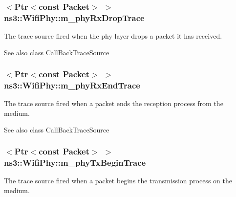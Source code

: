 \subsubsection[{\texorpdfstring{m\+\_\+phy\+Rx\+Drop\+Trace}{m_phyRxDropTrace}}]{$<${\bf Ptr}$<$const {\bf Packet}$>$ $>$ ns3\+::\+Wifi\+Phy\+::m\+\_\+phy\+Rx\+Drop\+Trace\hspace{0.3cm}{\ttfamily [private]}}\hypertarget{classns3_1_1WifiPhy_a4ed70c61781e7d5de9ae5bb16c613fb8}{}\label{classns3_1_1WifiPhy_a4ed70c61781e7d5de9ae5bb16c613fb8}
The trace source fired when the phy layer drops a packet it has received.

\begin{DoxySeeAlso}{See also}
class Call\+Back\+Trace\+Source 
\end{DoxySeeAlso}
\subsubsection[{\texorpdfstring{m\+\_\+phy\+Rx\+End\+Trace}{m_phyRxEndTrace}}]{$<${\bf Ptr}$<$const {\bf Packet}$>$ $>$ ns3\+::\+Wifi\+Phy\+::m\+\_\+phy\+Rx\+End\+Trace\hspace{0.3cm}{\ttfamily [private]}}\hypertarget{classns3_1_1WifiPhy_a49fafa73ef1e41ad7f93e792f523dfdd}{}\label{classns3_1_1WifiPhy_a49fafa73ef1e41ad7f93e792f523dfdd}
The trace source fired when a packet ends the reception process from the medium.

\begin{DoxySeeAlso}{See also}
class Call\+Back\+Trace\+Source 
\end{DoxySeeAlso}
\subsubsection[{\texorpdfstring{m\+\_\+phy\+Tx\+Begin\+Trace}{m_phyTxBeginTrace}}]{$<${\bf Ptr}$<$const {\bf Packet}$>$ $>$ ns3\+::\+Wifi\+Phy\+::m\+\_\+phy\+Tx\+Begin\+Trace\hspace{0.3cm}{\ttfamily [private]}}\hypertarget{classns3_1_1WifiPhy_adf60437bb052fa372a0cfa487a705620}{}\label{classns3_1_1WifiPhy_adf60437bb052fa372a0cfa487a705620}
The trace source fired when a packet begins the transmission process on the medium.

